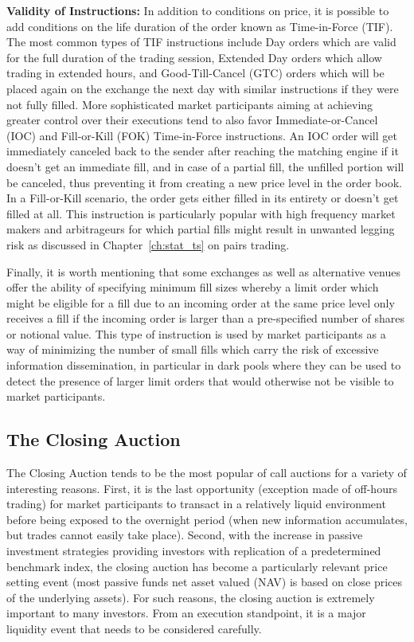 \noindent\textbf{Validity of Instructions:} In addition to conditions on price, it is possible to add conditions on the life duration of the order known as Time-in-Force (TIF). The most common types of TIF instructions include Day orders which are valid for the full duration of the trading session, Extended Day orders which allow trading in extended hours, and Good-Till-Cancel (GTC) orders which will be placed again on the exchange the next day with similar instructions if they were not fully filled. More sophisticated market participants aiming at achieving greater control over their executions tend to also favor Immediate-or-Cancel (IOC) and Fill-or-Kill (FOK) Time-in-Force instructions. An IOC order will get immediately canceled back to the sender after reaching the matching engine if it doesn't get an immediate fill, and in case of a partial fill, the unfilled portion will be canceled, thus preventing it from creating a new price level in the order book. In a Fill-or-Kill scenario, the order gets either filled in its entirety or doesn't get filled at all. This instruction is particularly popular with high frequency market makers and arbitrageurs for which partial fills might result in unwanted legging risk as discussed in Chapter~\ref{ch:stat_ts} on pairs trading.


Finally, it is worth mentioning that some exchanges as well as alternative venues offer the ability of specifying minimum fill sizes whereby a limit order which might be eligible for a fill due to an incoming order at the same price level only receives a fill if the incoming order is larger than a pre-specified number of shares or notional value. This type of instruction is used by market participants as a way of minimizing the number of small fills which carry the risk of excessive information dissemination, in particular in dark pools where they can be used to detect the presence of larger limit orders that would otherwise not be visible to market participants.  \\


\subsection{The Closing Auction} 
The Closing Auction tends to be the most popular of call auctions for a variety of interesting reasons. First, it is the last opportunity (exception made of off-hours trading) for market participants to transact in a relatively liquid environment before being exposed to the overnight period (when new information accumulates, but trades cannot easily take place). Second, with the increase in passive investment strategies providing investors with replication of a predetermined benchmark index, the closing auction has become a particularly relevant price setting event (most passive funds net asset valued (NAV) is based on close prices of the underlying assets). For such reasons, the closing auction is extremely important to many investors. From an execution standpoint, it is a major liquidity event that needs to be considered carefully.


